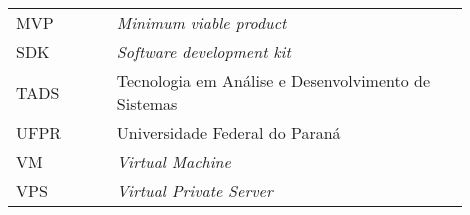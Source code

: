 

\begin{listaacron}

\begin{longtable}[l]{p{0.2\linewidth}p{0.7\linewidth}}
MVP & \emph{Minimum viable product}\\
SDK & \emph{Software development kit}\\
TADS & Tecnologia em Análise e Desenvolvimento de Sistemas\\
UFPR & Universidade Federal do Paraná\\
VM & \emph{Virtual Machine}\\
VPS & \emph{Virtual Private Server}\\
\end{longtable}

\end{listaacron}

